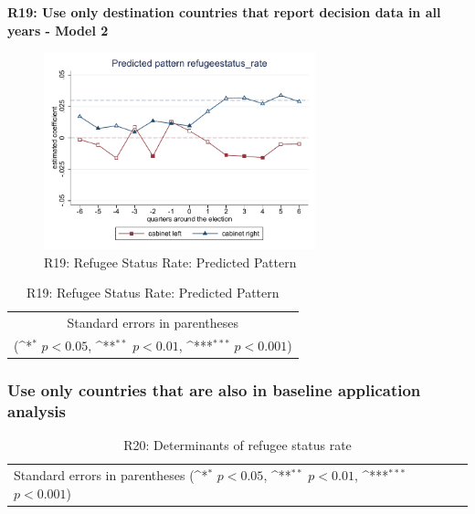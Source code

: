 \documentclass[10pt,a4paper]{scrartcl}
\begin{document}
\clearpage
\textbf{R19: Use only destination countries that report decision data in all years - Model 2}
\begin{figure}[!ht]
	\centering
	\includegraphics[width=0.7\textwidth]{figures_edited/refugeestatus_rate_graph2_R19.pdf}
	\caption{R19: Refugee Status Rate: Predicted Pattern}
\end{figure}

\begin{table}[!ht]\centering
	\footnotesize
	\renewcommand{\arraystretch}{1.2}
	\def\sym#1{\ifmmode^{#1}\else\(^{#1}\)\fi}
	\caption{R19: Refugee Status Rate: Predicted Pattern}
	\begin{tabular}{l*{2}{c}}
		\hline\hline
		
		\hline\hline
		\multicolumn{3}{c}{\footnotesize Standard errors in parentheses} \\
		\multicolumn{3}{c}{\footnotesize (\sym{*} \(p<0.05\), \sym{**} \(p<0.01\), \sym{***} \(p<0.001\))} \\
	\end{tabular}
\end{table}





\clearpage
\FloatBarrier
\subsubsection{Use only countries that are also in baseline application analysis}
\begin{table}[!ht]\centering
	\renewcommand{\arraystretch}{1.25}
	\small
	\def\sym#1{\ifmmode^{#1}\else\(^{#1}\)\fi}
	\caption{R20: Determinants of refugee status rate}
	\begin{tabular}{l*{3}{c}}
		\hline\hline
		
		\hline\hline
		\multicolumn{4}{l}{\footnotesize Standard errors in parentheses (\sym{*} \(p<0.05\), \sym{**} \(p<0.01\), \sym{***} \(p<0.001\))}\\
	\end{tabular}
\end{table}
\end{document}
